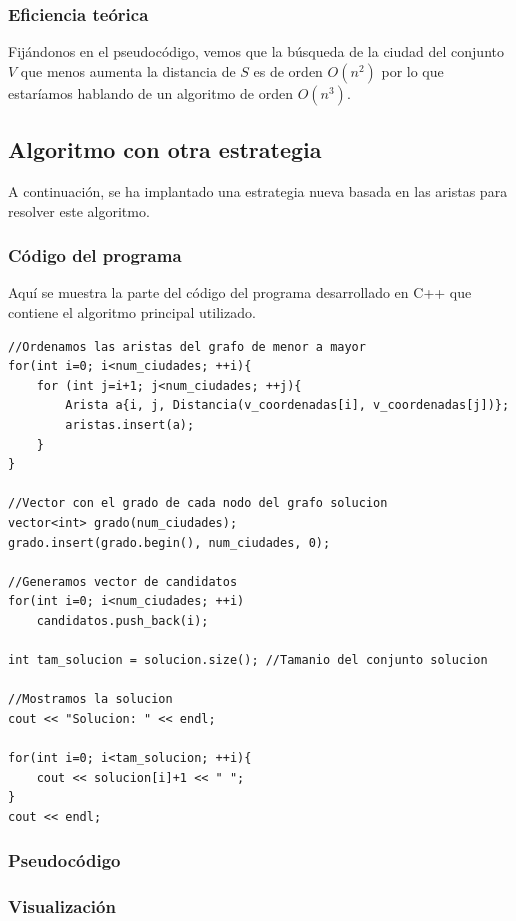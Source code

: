 \documentclass[11pt,a4paper]{article} %
\begin{document}
\subsubsection{Eficiencia teórica}
Fijándonos en el pseudocódigo, vemos que la búsqueda de la ciudad del conjunto $V$ que menos aumenta la distancia de $S$ es de orden $O(n^2)$ por lo que estaríamos hablando de un algoritmo de orden $O(n^3)$.


\newpage
\subsection{Algoritmo con otra estrategia}
A continuación, se ha implantado una estrategia nueva basada en las aristas para resolver este algoritmo.

\subsubsection{Código del programa}
Aquí se muestra la parte del código del programa desarrollado en C++ que contiene el algoritmo principal utilizado.

\begin{lstlisting}[style=C++]
//Ordenamos las aristas del grafo de menor a mayor
for(int i=0; i<num_ciudades; ++i){
	for (int j=i+1; j<num_ciudades; ++j){
		Arista a{i, j, Distancia(v_coordenadas[i], v_coordenadas[j])};
		aristas.insert(a);
	}
}

//Vector con el grado de cada nodo del grafo solucion
vector<int> grado(num_ciudades);
grado.insert(grado.begin(), num_ciudades, 0);

//Generamos vector de candidatos
for(int i=0; i<num_ciudades; ++i)
	candidatos.push_back(i);

int tam_solucion = solucion.size(); //Tamanio del conjunto solucion

//Mostramos la solucion
cout << "Solucion: " << endl;

for(int i=0; i<tam_solucion; ++i){
	cout << solucion[i]+1 << " ";
}
cout << endl;
\end{lstlisting}

\subsubsection{Pseudocódigo}

\subsubsection{Visualización}
\end{document}
